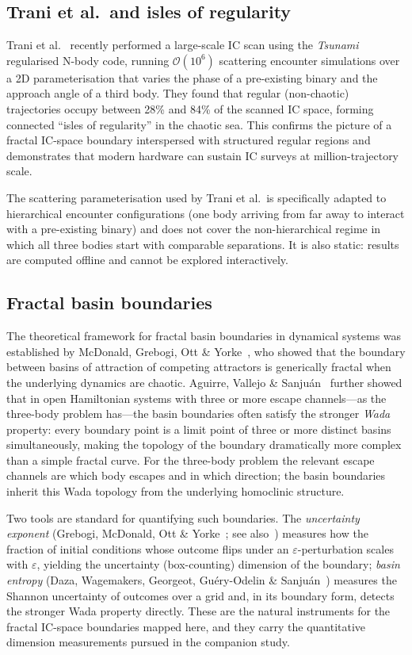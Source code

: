 \documentclass[11pt,a4paper]{article}
\begin{document}
\subsection{Trani et al.\ and isles of regularity}

Trani et al.~\cite{trani2024} recently performed a large-scale IC scan using the \emph{Tsunami}
regularised N-body code, running $\mathcal{O}(10^6)$ scattering encounter simulations over a
2D parameterisation that varies the phase of a pre-existing binary and the approach angle of a
third body.  They found that regular (non-chaotic) trajectories occupy between 28\% and 84\% of
the scanned IC space, forming connected ``isles of regularity'' in the chaotic sea.  This
confirms the picture of a fractal IC-space boundary interspersed with structured regular
regions and demonstrates that modern hardware can sustain IC surveys at million-trajectory scale.

The scattering parameterisation used by Trani et al.\ is specifically adapted to hierarchical
encounter configurations (one body arriving from far away to interact with a pre-existing
binary) and does not cover the non-hierarchical regime in which all three bodies start with
comparable separations.  It is also static: results are computed offline and cannot be explored
interactively.

\subsection{Fractal basin boundaries}

The theoretical framework for fractal basin boundaries in dynamical systems was established by
McDonald, Grebogi, Ott \& Yorke~\cite{mcdonald1985}, who showed that the boundary between
basins of attraction of competing attractors is generically fractal when the underlying dynamics
are chaotic.  Aguirre, Vallejo \& Sanju\'{a}n~\cite{aguirre2001} further showed that in open
Hamiltonian systems with three or more escape channels---as the three-body problem has---the
basin boundaries often satisfy the stronger \emph{Wada} property: every boundary point is a
limit point of three or more distinct basins simultaneously, making the topology of the
boundary dramatically more complex than a simple fractal curve.  For the three-body problem
the relevant escape channels are which body escapes and in which direction; the basin
boundaries inherit this Wada topology from the underlying homoclinic structure.

Two tools are standard for quantifying such boundaries.  The \emph{uncertainty exponent}
(Grebogi, McDonald, Ott \& Yorke~\cite{grebogi1983}; see also~\cite{mcdonald1985}) measures
how the fraction of initial conditions whose outcome flips under an $\varepsilon$-perturbation
scales with $\varepsilon$, yielding the uncertainty (box-counting) dimension of the boundary;
\emph{basin entropy} (Daza, Wagemakers, Georgeot, Gu\'{e}ry-Odelin \& Sanju\'{a}n~\cite{daza2016})
measures the Shannon uncertainty of outcomes over a grid and, in its boundary form, detects the
stronger Wada property directly.  These are the natural instruments for the fractal IC-space
boundaries mapped here, and they carry the quantitative dimension measurements pursued in the
companion study.
\end{document}
